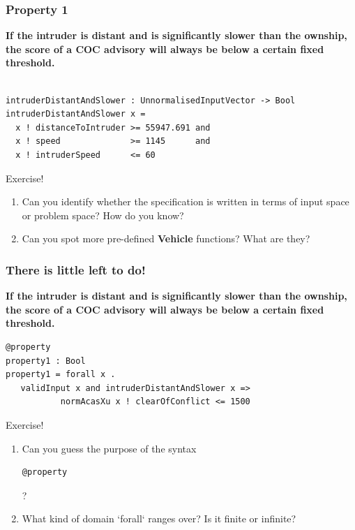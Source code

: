 \documentclass{beamer}
\begin{document}
\begin{frame}[fragile]
\frametitle{Property 1}

\footnotesize{\textbf{If the intruder is distant and is significantly slower than the ownship, the score of a COC advisory will always be below a certain fixed threshold.}}

\pause

\begin{verbatim}

intruderDistantAndSlower : UnnormalisedInputVector -> Bool
intruderDistantAndSlower x =
  x ! distanceToIntruder >= 55947.691 and
  x ! speed              >= 1145      and
  x ! intruderSpeed      <= 60
\end{verbatim}
\pause
\begin{block}{Exercise!}
\footnotesize{
\begin{enumerate}
\item
Can you identify whether the specification is written in terms of input space or problem space? How do you know?
\item Can you spot more pre-defined \textbf{Vehicle} functions? What are they?
\end{enumerate}}
\end{block}

\end{frame}

\begin{frame}[fragile]
\frametitle{There is little left to do!}

\footnotesize{
\textbf{If the intruder is distant and is significantly slower than the ownship, the score of a COC advisory will always be below a certain fixed threshold.}}

\pause

\begin{verbatim}
@property
property1 : Bool
property1 = forall x .
   validInput x and intruderDistantAndSlower x =>
           normAcasXu x ! clearOfConflict <= 1500
\end{verbatim}
\pause
\begin{block}{Exercise!}
\footnotesize{
\begin{enumerate}
\item Can you guess the purpose of the syntax
\begin{verbatim}
@property
\end{verbatim}
?
\item What kind of domain  `forall` ranges over? Is it finite or infinite?
\end{enumerate}}
\end{block}

\end{frame}
\end{document}
